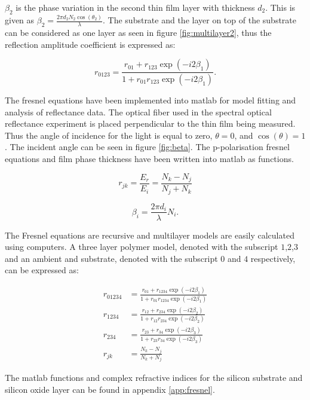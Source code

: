 \documentclass[MasterThesisMain.tex]{subfiles}
\begin{document}
$\beta_2$ is the phase variation in the second thin film layer with thickness $d_2$. This is given as $\beta_2=\frac{2\pi d_2N_2\cos(\theta_2)}{\lambda}$. The substrate and the layer on top of the substrate can be considered as one layer as seen in figure \ref{fig:multilayer2}, thus the reflection amplitude coefficient is expressed as:         

\begin{equation}\label{eq:multilayer}
r_{0123}= \frac{r_{01}+r_{123}\exp(-i2\beta_1)}{1+r_{01}r_{123}\exp(-i2\beta_1)}.
\end{equation}

The fresnel equations have been implemented into matlab for model fitting and analysis of reflectance data. The optical fiber used in  the spectral optical reflectance experiment is placed perpendicular to the thin film being measured. Thus the angle of incidence for the light is equal to zero, $\theta=0$, and $\cos(\theta)=1$. The incident angle can be seen in figure \ref{fig:beta}. The p-polarisation fresnel equations and film phase thickness have been written into matlab as functions.

\begin{equation}
r_{jk} = \frac{E_{r}}{E_{i}} = \frac{N_k-N_j}{N_j+N_k}
\end{equation}

\begin{equation}
\beta_i=\frac{2\pi d_i}{\lambda} N_i.
\end{equation}

The Fresnel equations are recursive and multilayer models are easily calculated using computers. A three layer polymer model, denoted with the subscript $1$,$2$,$3$ and an ambient and substrate, denoted with the subscript $0$ and $4$ respectively, can be expressed as:

\begin{align}
r_{01234}&= \frac{r_{01}+r_{1234}\exp(-i2\beta_1)}{1+r_{01}r_{1234}\exp(-i2\beta_1)} \\
r_{1234} &= \frac{r_{12}+r_{234}\exp(-i2\beta_2)}{1+r_{12}r_{234}\exp(-i2\beta_2)} \\
r_{234}  &= \frac{r_{23}+r_{34}\exp(-i2\beta_3)}{1+r_{23}r_{34}\exp(-i2\beta_3)} \\
r_{jk}   &= \frac{N_k-N_j}{N_k + N_j}  
\end{align}
 
The matlab functions and complex refractive indices for the silicon substrate and silicon oxide layer can be found in appendix \ref{app:fresnel}. 


 

  
\end{document}
